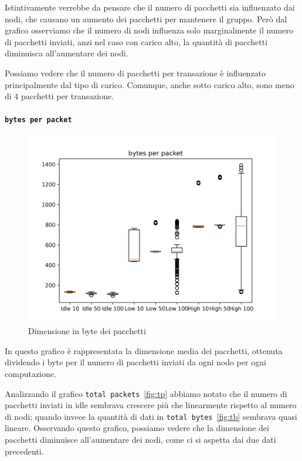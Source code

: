 \documentclass[12pt, a4paper]{article}
\begin{document}
Istintivamente verrebbe da pensare che il numero di pacchetti sia influenzato dai nodi, che causano un aumento dei pacchetti per mantenere il gruppo.
Però dal grafico osserviamo che il numero di nodi influenza solo marginalmente il numero di pacchetti inviati, anzi nel caso con carico alto, la quantità di pacchetti diminuisca all'aumentare dei nodi.

Possiamo vedere che il numero di pacchetti per transazione è influenzato principalmente dal tipo di carico. Comunque, anche sotto carico alto, sono meno di $4$ pacchetti per transazione.

\paragraph{\lstinline{bytes per packet}}

\begin{figure}[H]
    \includegraphics[width=\linewidth, keepaspectratio]{graphs/bytes per packet.png}
    \caption{Dimensione in byte dei pacchetti}
    \label{fig:bp}
\end{figure}

In questo grafico è rappresentata la dimensione media dei pacchetti, ottenuta dividendo i byte per il numero di pacchetti inviati da ogni nodo per ogni computazione.

Analizzando il grafico \lstinline{total packets}~\ref{fig:tp} abbiamo notato che il numero di pacchetti inviati in idle sembrava crescere più che linearmente rispetto al numero di nodi; quando invece la quantità di dati in \lstinline{total bytes}~\ref{fig:tb} sembrava quasi lineare.
Osservando questo grafico, possiamo vedere che la dimensione dei pacchetti diminuisce all'aumentare dei nodi, come ci si aspetta dai due dati precedenti.
\end{document}
